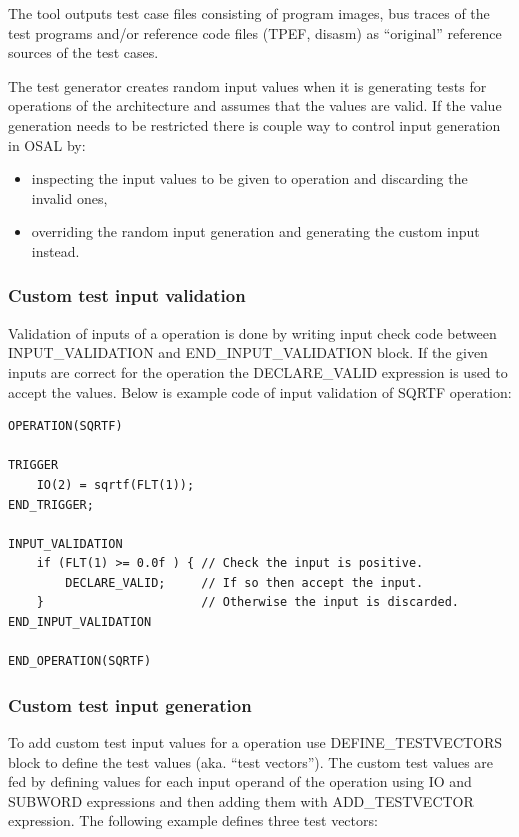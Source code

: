 \documentclass[a4paper,twoside]{tceusermanual}
\begin{document}
The tool outputs test case files consisting of program images, bus
traces of the test programs and/or reference code files (TPEF, disasm)
as ``original'' reference sources of the test cases.


The test generator creates random input values when it is generating
tests for operations of the architecture and assumes that the values
are valid. If the value generation needs to be restricted there is
couple way to control input generation in OSAL by:

\begin{itemize}
\item inspecting the input values to be given to operation and
  discarding the invalid ones,
\item overriding the random input generation and generating the custom input
  instead.
\end{itemize}

\subsubsection{Custom test input validation}

Validation of inputs of a operation is done by writing input check
code between INPUT\_VALIDATION and END\_INPUT\_VALIDATION block. If
the given inputs are correct for the operation the DECLARE\_VALID
expression is used to accept the values. Below is example code of
input validation of SQRTF operation:

\begin{verbatim}
OPERATION(SQRTF)

TRIGGER
    IO(2) = sqrtf(FLT(1));
END_TRIGGER;

INPUT_VALIDATION
    if (FLT(1) >= 0.0f ) { // Check the input is positive.
        DECLARE_VALID;     // If so then accept the input.
    }                      // Otherwise the input is discarded.
END_INPUT_VALIDATION

END_OPERATION(SQRTF)
\end{verbatim}

\subsubsection{Custom test input generation}

To add custom test input values for a operation use
DEFINE\_TESTVECTORS block to define the test values (aka.  ``test
vectors''). The custom test values are fed by defining values for each
input operand of the operation using IO and SUBWORD expressions and
then adding them with ADD\_TESTVECTOR expression.  The following
example defines three test vectors:
\end{document}
